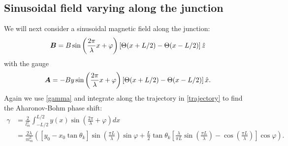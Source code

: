 \subsection{Sinusoidal field varying along the junction}
\label{sec:alongJunction}
We will next consider a sinusoidal magnetic field along the junction:
\begin{equation}
    \boldsymbol{B} = B\sin\left(\frac{2\pi}{\lambda}x + \varphi\right)\left[\Theta(x+L/2) - \Theta(x-L/2) \right]\hat{z}
\label{B4}
\end{equation}
with the gauge
\begin{equation}
    \boldsymbol{A} = -By\sin\left(\frac{2\pi}{\lambda}x + \varphi\right)\left[\Theta(x+L/2) - \Theta(x-L/2) \right]\hat{x}.
\label{A4}
\end{equation}
Again we use \eqref{gamma} and integrate along the trajectory in \eqref{trajectory} to find the Aharonov-Bohm phase shift:
\begin{equation}
\begin{split}
    \gamma &= \frac{2}{l_m^2}\int_{-L/2}^{L/2}y(x)\sin\left(\frac{2\pi}{\lambda} +\varphi \right) dx \\
    &= \frac{2\lambda}{\pi l_m^2}\left(\left[y_0 - x_0\tan\theta_k\right]\sin\left(\frac{\pi L}{\lambda}\right)\sin\varphi+\frac{L}{2}\tan\theta_k\left[\frac{\lambda}{\pi L}\sin\left(\frac{\pi L}{\lambda}\right)-\cos\left(\frac{\pi L}{\lambda}\right)\right]\cos\varphi\right).
\end{split}
\label{gamma2}
\end{equation}


